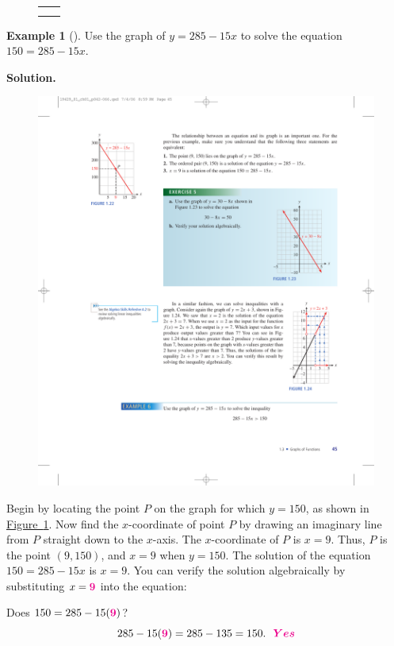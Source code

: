 \documentclass[10pt,]{book}
\theoremstyle{plain}
\theoremstyle{definition}
\theoremstyle{definition}
\newtheorem{example}[theorem]{Example}
\theoremstyle{definition}
\theoremstyle{definition}
\numberwithin{equation}{part}
\newlength{\panelmax}
\newcommand{\alert}[1]{\boldsymbol{\color{magenta}{#1}}}
\begin{document}
{{}
\newlength{\phBWimage}\setlength{\phBWimage}{\ht\panelboxBWimage+\dp\panelboxBWimage}
\settototalheight{\phBWimage}{\usebox{\panelboxBWimage}}
\setlength{\panelmax}{\maxof{\panelmax}{\phBWimage}}
\leavevmode%
\setlength{\tabcolsep}{0\textwidth}
\begin{figure}
\begin{tabular}{@{}*{2}{c}@{}}
\begin{minipage}[c][\panelmax][t]{0.5\textwidth}\usebox{\panelboxCparagraphs}\end{minipage}&
\begin{minipage}[c][\panelmax][t]{0.5\textwidth}\usebox{\panelboxBWimage}\end{minipage}\tabularnewline
&
\parbox[t]{0.5\textwidth}{
}\end{tabular}
\end{figure}
}%
\begin{example}[]\label{example-graph-to-solve}
Use the graph of \(y = 285 - 15x\) to solve the equation \(150 = 285 - 15x\).%
\par\medskip\noindent%
\textbf{Solution.}\quad \leavevmode%
\begin{figure}
\centering
\includegraphics[width=0.5\linewidth]{images/fig-graph-to-solve}
\caption{\label{fig-graph-to-solve}}
\end{figure}
Begin by locating the point \(P\) on the graph for which \(y = 150\), as shown in \hyperref[fig-graph-to-solve]{Figure~\ref{fig-graph-to-solve}}. Now find the \(x\)-coordinate of point \(P\) by drawing an imaginary line from \(P\) straight down to the \(x\)-axis. The \(x\)-coordinate of \(P\) is \(x = 9\). Thus, \(P\) is the point \((9,150)\), and \(x = 9\) when \(y = 150\). The solution of the equation \(150 = 285 - 15x\) is \(x = 9\). You can verify the solution algebraically by substituting \(x = \alert{9}\) into the equation:%
\par
Does \(150 = 285 - 15(\alert{9})\)?%
%
\begin{equation*}
285 - 15(\alert{9}) = 285 - 135 = 150. ~~\alert{Yes}
\end{equation*}
\end{example}
\end{document}
